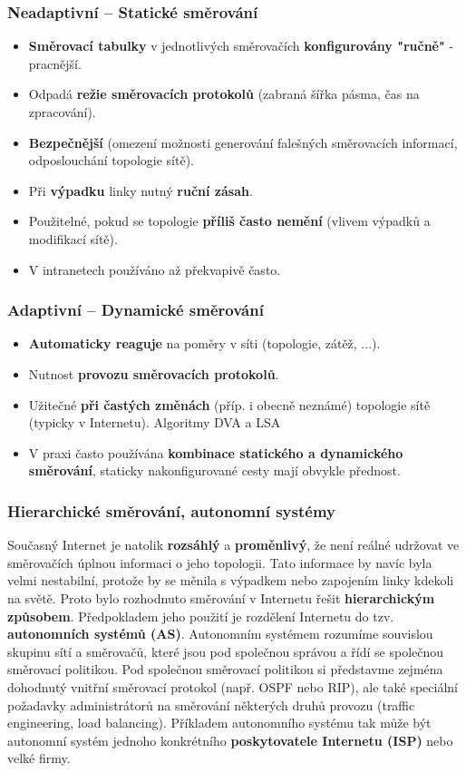 \subsubsection{Neadaptivní -- Statické směrování}
\begin{itemize}
\item \textbf{Směrovací tabulky} v jednotlivých směrovačích \textbf{konfigurovány "ručně"} - pracnější.
\item Odpadá \textbf{režie směrovacích protokolů} (zabraná šířka pásma, čas na zpracování).
\item \textbf{Bezpečnější} (omezení možnosti generování falešných směrovacích informací, odposlouchání topologie sítě).
\item Při \textbf{výpadku} linky nutný \textbf{ruční zásah}.
\item Použitelné, pokud se topologie \textbf{příliš často nemění} (vlivem výpadků a modifikací sítě).
\item V intranetech používáno až překvapivě často.
\end{itemize}

\subsubsection{Adaptivní -- Dynamické směrování}
\begin{itemize}
\item \textbf{Automaticky reaguje} na poměry v síti (topologie, zátěž, ...).
\item Nutnost\textbf{ provozu směrovacích protokolů}.
\item Užitečné \textbf{při častých změnách} (příp. i obecně neznámé) topologie sítě (typicky v Internetu). Algoritmy DVA a LSA
\item V praxi často používána \textbf{kombinace statického a dynamického směrování}, staticky nakonfigurované cesty mají obvykle přednost.
\end{itemize}

\subsubsection{Hierarchické směrování, autonomní systémy}
Současný Internet je natolik \textbf{rozsáhlý} a \textbf{proměnlivý}, že není reálné udržovat ve směrovačích úplnou informaci o jeho topologii. Tato informace by navíc byla velmi nestabilní, protože by se měnila s výpadkem nebo zapojením linky kdekoli na světě. Proto bylo rozhodnuto směrování v Internetu řešit \textbf{hierarchickým způsobem}. Předpokladem jeho použití je rozdělení Internetu do tzv. \textbf{autonomních systémů (AS)}. Autonomním systémem rozumíme souvislou skupinu sítí a směrovačů, které jsou pod společnou správou a řídí se společnou směrovací politikou. Pod společnou směrovací politikou si představme zejména dohodnutý vnitřní směrovací protokol (např. OSPF nebo RIP), ale také speciální požadavky administrátorů na směrování některých druhů provozu (traffic engineering, load balancing). Příkladem autonomního systému tak může být autonomní systém jednoho konkrétního\textbf{ poskytovatele Internetu (ISP)} nebo velké firmy.

